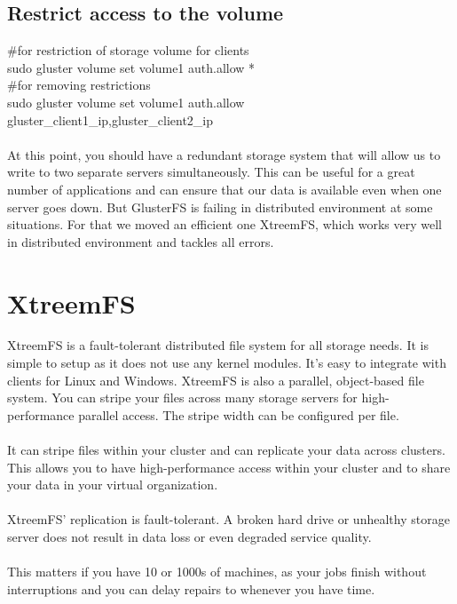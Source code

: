 \documentclass[12pt]{report}
\begin{document}
\subsection{Restrict access to the volume}
\#for restriction of storage volume for clients\\
sudo gluster volume set volume1 auth.allow *\\
\#for removing restrictions\\
sudo gluster volume set volume1 auth.allow gluster\_client1\_ip,gluster\_client2\_ip\\
\\
At this point, you should have a redundant storage system that will allow us to write to two separate servers simultaneously. This can be useful for a great number of applications and can ensure that our data is available even when one server goes down. But GlusterFS is failing in distributed environment at some situations. For that we moved an efficient one XtreemFS, which works very well in distributed environment and tackles all errors.\\
\pagebreak
\section{XtreemFS}
XtreemFS is a fault-tolerant distributed file system for all storage needs. It is simple to setup as it does not use any kernel modules. It's easy to integrate with clients for Linux and Windows. XtreemFS is also a parallel, object-based file system. You can stripe your files across many storage servers for high-performance parallel access. The stripe width can be configured per file.\\
\\
It can stripe files within your cluster and can replicate your data across clusters. This allows you to have high-performance access within your cluster and to share your data in your virtual organization.\\
\\
XtreemFS' replication is fault-tolerant. A broken hard drive or unhealthy storage server does not result in data loss or even degraded service quality. \\
\\
This matters if you have 10 or 1000s of machines, as your jobs finish without interruptions and you can delay repairs to whenever you have time.\\
\end{document}
